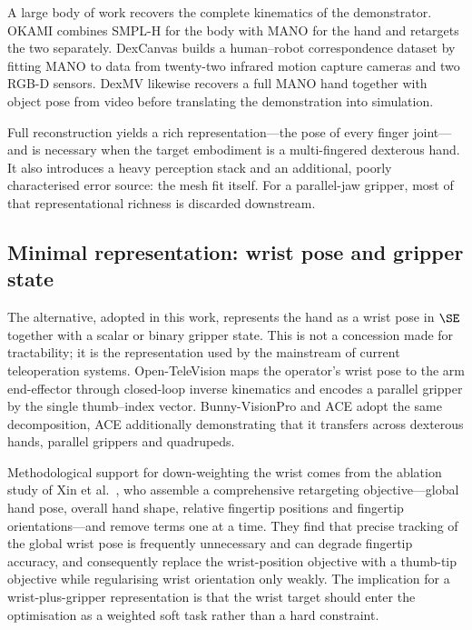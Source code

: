 A large body of work recovers the complete kinematics of the demonstrator.
OKAMI \cite{okami} combines SMPL-H for the body with MANO for the hand and
retargets the two separately. DexCanvas \cite{dexcanvas} builds a human--robot
correspondence dataset by fitting MANO to data from twenty-two infrared motion
capture cameras and two RGB-D sensors. DexMV \cite{dexmv} likewise recovers a
full MANO hand together with object pose from video before translating the
demonstration into simulation.

Full reconstruction yields a rich representation---the pose of every finger
joint---and is necessary when the target embodiment is a multi-fingered
dexterous hand. It also introduces a heavy perception stack and an additional,
poorly characterised error source: the mesh fit itself. For a parallel-jaw
gripper, most of that representational richness is discarded downstream.

\subsection{Minimal representation: wrist pose and gripper state}

The alternative, adopted in this work, represents the hand as a wrist pose in
$\SE$ together with a scalar or binary gripper state. This is not a concession
made for tractability; it is the representation used by the mainstream of
current teleoperation systems. Open-TeleVision \cite{opentv} maps the operator's
wrist pose to the arm end-effector through closed-loop inverse kinematics and
encodes a parallel gripper by the single thumb--index vector. Bunny-VisionPro
\cite{bunny} and ACE \cite{ace} adopt the same decomposition, ACE additionally
demonstrating that it transfers across dexterous hands, parallel grippers and
quadrupeds.

Methodological support for down-weighting the wrist comes from the ablation
study of Xin et al.\ \cite{keyobj}, who assemble a comprehensive retargeting
objective---global hand pose, overall hand shape, relative fingertip positions
and fingertip orientations---and remove terms one at a time. They find that
precise tracking of the global wrist pose is frequently unnecessary and can
degrade fingertip accuracy, and consequently replace the wrist-position
objective with a thumb-tip objective while regularising wrist orientation only
weakly. The implication for a wrist-plus-gripper representation is that the
wrist target should enter the optimisation as a weighted soft task rather than
a hard constraint.

